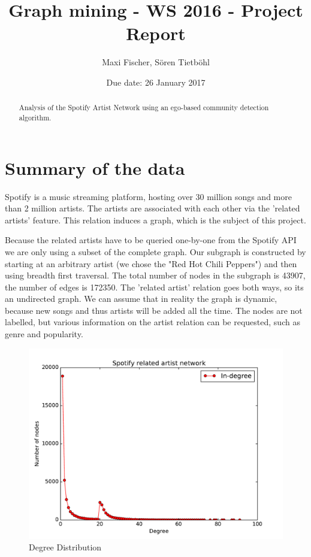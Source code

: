 \documentclass[11pt,a4paper,onecolumn,notitlepage]{article}
\begin{document}
\title{Graph mining - WS 2016 - Project Report}




\date{Due date: 26 January 2017}

\author{
Maxi Fischer, S\"oren Tietb\"ohl\\ 
}


\maketitle



\begin{abstract}
Analysis of the Spotify Artist Network using an ego-based community detection algorithm.
\end{abstract}


\section{Summary of the data}

Spotify is a music streaming platform, hosting over 30 million songs and more than 2 million artists. The artists are associated with each other via the 'related artists' feature. This relation induces a graph, which is the subject of this project.

Because the related artists have to be queried one-by-one from the Spotify API we are only using a subset of the complete graph. Our subgraph is constructed by starting at an arbitrary artist (we chose the "Red Hot Chili Peppers") and then using breadth first traversal. The total number of nodes in the subgraph is 43907, the number of edges is 172350. The 'related artist' relation goes both ways, so its an undirected graph. We can assume that in reality the graph is dynamic, because new songs and thus artists will be added all the time. The nodes are not labelled, but various information on the artist relation can be requested, such as genre and popularity.

\begin{figure}[H]
\centering
\includegraphics[scale=0.4]{spotify_degree_distribution.pdf}
\caption{Degree Distribution}
\end{figure}
\end{document}
